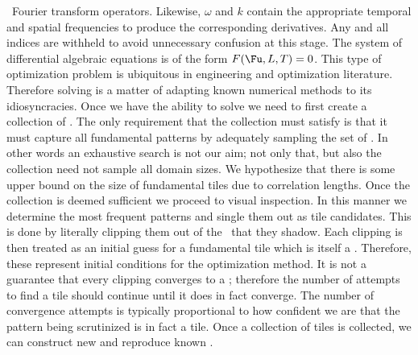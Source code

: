 \spt\ Fourier transform operators. Likewise, $\omega$ and $k$ contain the appropriate temporal and spatial frequencies to produce the corresponding derivatives. Any and all indices are withheld
to avoid unnecessary confusion at this stage.
The {\spt} system of differential algebraic equations  
is of the form $F(\Fu, L, T)=0$. This type of optimization problem is ubiquitous in
engineering and optimization literature. Therefore solving  is a matter of
adapting known numerical methods to its idiosyncracies.
Once we have the ability to solve  we need to first create a collection
of \twots. The only requirement that the collection must satisfy is that it must capture
all fundamental patterns by adequately sampling the set of \twots. In other words an exhaustive
search is not our aim; not only that, but also the collection need not sample all {\spt} domain sizes.
We hypothesize that there is some upper bound on the {\spt} size of fundamental tiles due to {\spt}
correlation lengths. 
Once the collection is deemed sufficient we proceed to visual inspection. In this manner
we determine the most frequent patterns and single them out as tile candidates. This is
done by literally clipping them out of the \twots\ that they shadow. Each clipping is
then treated as an initial guess for a fundamental tile which is itself a \twot. Therefore,
these represent initial conditions for the optimization method. It is not a guarantee
that every clipping converges to a \twot; therefore the number of attempts to find a tile
should continue until it does in fact converge. The number of convergence attempts is typically
proportional to how confident we are that the pattern being scrutinized is in fact a tile.
Once a collection of tiles is collected, we can construct new and reproduce known \twots. 
